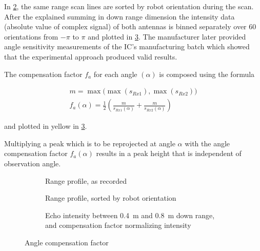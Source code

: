 In \cref{fig:angle-2}, the same range scan lines are sorted by robot
orientation during the scan. After the explained summing in down range
dimension the intensity data (absolute value of complex signal) of both
antennas is binned separately over 60 orientations from \(-\pi\) to
\(\pi\) and plotted in \cref{fig:angle-3}. The manufacturer later provided
angle sensitivity measurements of the
IC's manufacturing batch which showed that the
experimental approach produced valid results.

The compensation factor \(f_a\) for each angle $(\alpha)$ is composed using
the formula

\begin{align}
    m = \max \bigl( \max (s_{Rx1}), \max (s_{Rx2}) \bigr) \nonumber
    \\
    f_a(\alpha) = \frac{1}{2}
        \left(
            \frac{m}{ s_{Rx1}(\alpha) } +
            \frac{m}{ s_{Rx2}(\alpha) }
        \right)
\end{align}

and plotted in yellow in \cref{fig:angle-3}.

Multiplying a peak which is to be reprojected at angle \(\alpha\)
with the angle compensation factor \(f_a(\alpha)\) results in a peak height
that is independent of observation angle.

\begin{figure}[htbp]
    \centering
    \begin{subfigure}{.85\textwidth}
        \centering
        \def\svgwidth{\linewidth} \small
        
        \caption{Range profile, as recorded} \label{fig:angle-1}
        \bigskip
    \end{subfigure}
    \begin{subfigure}{.85\textwidth}
        \centering
        \def\svgwidth{\linewidth} \small
        
        \caption{Range profile, sorted by robot orientation} \label{fig:angle-2}
        \bigskip
    \end{subfigure}
    \begin{subfigure}{.85\textwidth}
        \centering
        \def\svgwidth{\linewidth} \small
        
        \caption{Echo intensity between \SI{0.4}{m} and \SI{0.8}{m} down range, and compensation factor normalizing intensity} \label{fig:angle-3}
        \bigskip
    \end{subfigure}
    \caption{Angle compensation factor}
    \label{fig:fig_angle_compensation}
\end{figure}

